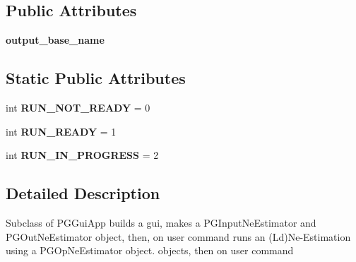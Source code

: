 \subsection*{Public Attributes}
\begin{DoxyCompactItemize}
\item 
{\bfseries output\+\_\+base\+\_\+name}\hypertarget{classnegui_1_1pgguineestimator__experimental_1_1PGGuiNeEstimator_aa99bb40c806d746401e2b59bbdc7d0a8}{}\label{classnegui_1_1pgguineestimator__experimental_1_1PGGuiNeEstimator_aa99bb40c806d746401e2b59bbdc7d0a8}

\end{DoxyCompactItemize}
\subsection*{Static Public Attributes}
\begin{DoxyCompactItemize}
\item 
int {\bfseries R\+U\+N\+\_\+\+N\+O\+T\+\_\+\+R\+E\+A\+DY} = 0\hypertarget{classnegui_1_1pgguineestimator__experimental_1_1PGGuiNeEstimator_aa1cb966f1cfc098f9eacf608db8085d1}{}\label{classnegui_1_1pgguineestimator__experimental_1_1PGGuiNeEstimator_aa1cb966f1cfc098f9eacf608db8085d1}

\item 
int {\bfseries R\+U\+N\+\_\+\+R\+E\+A\+DY} = 1\hypertarget{classnegui_1_1pgguineestimator__experimental_1_1PGGuiNeEstimator_a137d1bcc1d742bda068b0930b4d2b611}{}\label{classnegui_1_1pgguineestimator__experimental_1_1PGGuiNeEstimator_a137d1bcc1d742bda068b0930b4d2b611}

\item 
int {\bfseries R\+U\+N\+\_\+\+I\+N\+\_\+\+P\+R\+O\+G\+R\+E\+SS} = 2\hypertarget{classnegui_1_1pgguineestimator__experimental_1_1PGGuiNeEstimator_a3dee46e63125924a49360860c24595d3}{}\label{classnegui_1_1pgguineestimator__experimental_1_1PGGuiNeEstimator_a3dee46e63125924a49360860c24595d3}

\end{DoxyCompactItemize}


\subsection{Detailed Description}
\begin{DoxyVerb}Subclass of PGGuiApp builds a gui,
makes a PGInputNeEstimator and PGOutNeEstimator 
object, then, on user command runs an (Ld)Ne-Estimation
using a PGOpNeEstimator object.
objects, then on user command   
\end{DoxyVerb}
 

